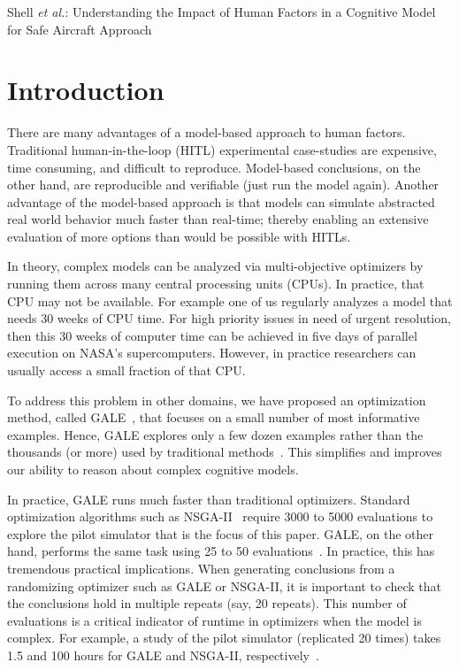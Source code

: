 \documentclass[journal]{IEEEtran}
\begin{document}

%
{Shell \MakeLowercase{\textit{et al.}}: Understanding the Impact of Human Factors in a Cognitive Model for Safe Aircraft Approach}


\IEEEdisplaynotcompsoctitleabstractindextext
\IEEEpeerreviewmaketitle



\section{Introduction}
There are many advantages of a model-based approach to human factors. 
Traditional human-in-the-loop (HITL) experimental case-studies are expensive, time consuming, and difficult to reproduce.
Model-based conclusions, on the other hand, are reproducible and verifiable (just run the model again).
Another advantage of the model-based approach is that models can simulate abstracted
real world behavior much faster than real-time;
thereby enabling an extensive evaluation of more options than would be possible with HITLs.

In theory, complex models can be analyzed via multi-objective optimizers by running them across many 
central processing units (CPUs). 
In practice, that CPU may not be available.
For example one of us regularly analyzes a model that needs 30 weeks of CPU time. 
For high priority issues in need of urgent resolution, then this 30 weeks of computer time can be achieved in five days of parallel execution on NASA's supercomputers.
However, in practice  researchers can usually access a small fraction of that CPU.  


To address this problem in other domains, we have proposed an optimization method, called GALE~\cite{krall14aaai,krallphd,galepaper},
that  focuses on a small number of most informative examples.
Hence, GALE explores only a few dozen examples rather than the thousands (or more) used  by traditional methods~\cite{galepaper,krall14aaai}. 
This simplifies and improves our ability to reason about complex cognitive models.

In practice, GALE runs much faster than traditional optimizers. 
Standard optimization algorithms such as NSGA-II~\cite{deb00afast} require 3000 to 5000 evaluations to explore the pilot simulator that is the focus of this paper. 
GALE, on the other hand, performs the same task using 25 to 50 evaluations~\cite{krallphd}.
In practice, this has tremendous practical implications.
When generating conclusions from a randomizing optimizer such as GALE or NSGA-II, it is important to check that the conclusions hold in multiple repeats (say, 20 repeats). 
This number of evaluations is a critical indicator of runtime in optimizers when the model is complex.
For example, a study of the pilot simulator (replicated 20 times)
takes 1.5 and 100 hours for GALE and NSGA-II, respectively~\cite{krallphd}.
\end{document}

